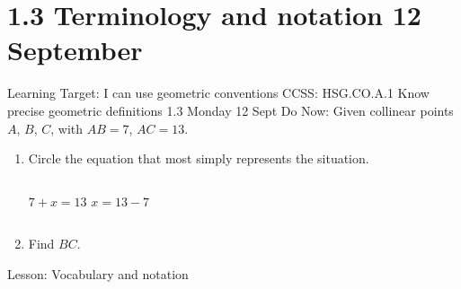 \documentclass[onlytextwidth]{beamer}
\begin{document}
\section{1.3 Terminology and notation \hfill 12 September}
\begin{frame}{Learning Target: I can use geometric conventions}
  {CCSS: HSG.CO.A.1 Know precise geometric definitions \hfill \alert{1.3 Monday 12 Sept}}
  Do Now: Given collinear points $A$, $B$, $C$, with $AB=7$, $AC=13$.
  \begin{center}
  \end{center}
  \begin{enumerate}
    \item Circle the equation that most simply represents the situation. \medskip
    \begin{columns}[c]
      \qquad \hspace{2cm} $7 + x = 13$
      $x = 13 - 7$
    \end{columns}
    \item Find $BC$.
  \end{enumerate} \vspace{2cm}
  Lesson: Vocabulary and notation
  \end{frame}
\end{document}
